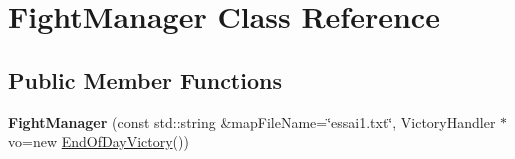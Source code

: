 \hypertarget{class_fight_manager}{}\section{Fight\+Manager Class Reference}
\label{class_fight_manager}
\subsection*{Public Member Functions}
\begin{DoxyCompactItemize}
\item 
{\bfseries Fight\+Manager} (const std\+::string \&map\+File\+Name=\char`\"{}essai1.\+txt\char`\"{}, Victory\+Handler $\ast$vo=new \hyperlink{class_end_of_day_victory}{End\+Of\+Day\+Victory}())\hypertarget{class_fight_manager_a323829deac221a6e6fa0766be3db126d}{}\label{class_fight_manager_a323829deac221a6e6fa0766be3db126d}


\end{DoxyCompactItemize}
